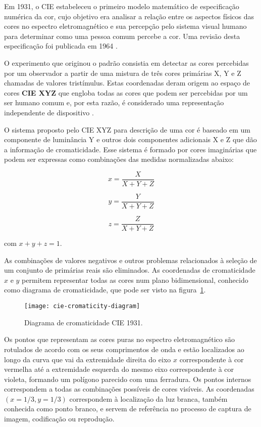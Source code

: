 Em 1931, o CIE estabeleceu o primeiro modelo matemático de especificação numérica da cor, cujo objetivo era analisar a relação entre os aspectos físicos das cores no espectro eletromagnético e sua percepção pelo sistema visual humano para determinar como uma pessoa comum percebe a cor. Uma revisão desta especificação foi publicada em 1964 \citep{gonzalez:02}.

O experimento que originou o padrão consistia em detectar as cores percebidas por um observador a partir de uma mistura de três cores primárias X, Y e Z chamadas de valores tristímulus. Estas coordenadas deram origem ao espaço de cores \textbf{CIE XYZ} que engloba todas as cores que podem ser percebidas por um ser humano comum e, por esta razão, é considerado uma representação independente de dispositivo \citep{konstantinos:00}.

O sistema proposto pelo CIE XYZ para descrição de uma cor é baseado em um componente de luminância Y e outros dois componentes adicionais X e Z que dão a informação de cromaticidade. Esse sistema é formado por cores imaginárias que podem ser expressas como combinações das medidas normalizadas abaixo:


\begin{equation}
  x = \frac{X}{X + Y + Z}
\end{equation}

\begin{equation}
  y = \frac{Y}{X + Y + Z}
\end{equation}

\begin{equation}
  z = \frac{Z}{X + Y + Z}
\end{equation}

com $x + y+ z = 1$.

As combinações de valores negativos e outros problemas relacionados à seleção de um conjunto de primárias reais são eliminados.  As coordenadas de cromaticidade $x$ e $y$ permitem representar todas as cores num plano bidimensional, conhecido como diagrama de cromaticidade, que pode ser visto na figura~\ref{fig:cie-cromaticity-diagram}.

\begin{figure}[!h]
  \centering
  \texttt{[image: cie-cromaticity-diagram]}
  \caption{Diagrama de cromaticidade CIE 1931.}
  \label{fig:cie-cromaticity-diagram} 
\end{figure}

Os pontos que representam as cores puras no espectro eletromagnético são rotulados de acordo com os seus comprimentos de onda e estão localizados ao longo da curva que vai da extremidade direita do eixo $x$ correspondente à cor vermelha até a extremidade esquerda do mesmo eixo correspondente à cor violeta, formando um polígono parecido com uma ferradura. Os pontos internos correspondem a todas as combinações possíveis de cores visíveis. As coordenadas $(x = 1/3, y = 1/3)$ correspondem à localização da luz branca, também conhecida como ponto branco, e servem de referência no processo de captura de imagem, codificação ou reprodução.

